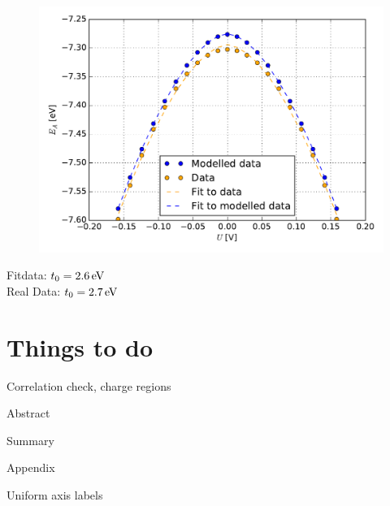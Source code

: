 \begin{figure}
	\centering
	\includegraphics[width = 13cm]{Images/polyacetylene/charging/Homo_energy_charge}
	\caption{}
	\label{}
\end{figure}
Fitdata: $t_0 = \unit[2.6]{eV}$\\
Real Data: $t_0 = \unit[2.7]{eV}$


\chapter{Things to do}
\begin{compactitem}
	\item Correlation check, charge regions
	\item Abstract
	\item Summary
	\item Appendix
	\item Uniform axis labels
\end{compactitem}